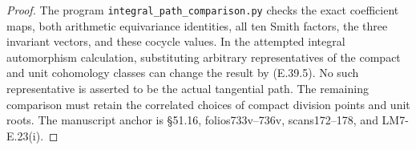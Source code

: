 \begin{proof}
The program \texttt{integral\_path\_comparison.py}
checks the exact coefficient maps, both arithmetic
equivariance identities, all ten Smith factors, the
three invariant vectors, and these cocycle values.
In the attempted integral automorphism calculation,
substituting arbitrary representatives of the compact
and unit cohomology classes can change the result by
(E.39.5). No such representative is asserted to be the
actual tangential path. The remaining comparison must
retain the correlated choices of compact division
points and unit roots. The manuscript anchor is
\S51.16, folios733v--736v, scans172--178, and
LM7-E.23(i).
\end{proof}
